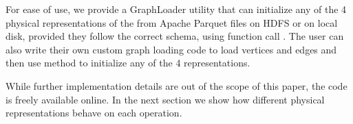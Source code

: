 For ease of use, we provide a GraphLoader utility that can initialize
any of the 4 physical representations of the \tg from Apache Parquet
files on HDFS or on local disk, provided they follow the correct
schema, using function call
.  The \ql user can also
write their own custom graph loading code to load vertices and edges
and then use  method to initialize any of the 4
representations.

 While further implementation
details are out of the scope of this paper, the \ql code is freely
available online.  In the next section we show how different physical
representations behave on each operation.


